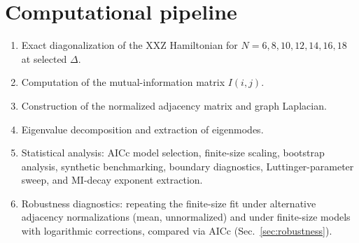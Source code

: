 \documentclass[aps,prd,twocolumn,superscriptaddress,nofootinbib]{revtex4-2}
\begin{document}
\appendix

\section{Computational pipeline}

\begin{enumerate}
\item Exact diagonalization of the XXZ Hamiltonian for
$N=6,8,10,12,14,16,18$ at selected $\Delta$.
\item Computation of the mutual-information matrix $I(i,j)$.
\item Construction of the normalized adjacency matrix and graph Laplacian.
\item Eigenvalue decomposition and extraction of eigenmodes.
\item Statistical analysis: AICc model selection, finite-size scaling,
bootstrap analysis, synthetic benchmarking, boundary diagnostics,
Luttinger-parameter sweep, and MI-decay exponent extraction.
\item Robustness diagnostics: repeating the finite-size fit under
alternative adjacency normalizations (mean, unnormalized) and under
finite-size models with logarithmic corrections, compared via AICc
(Sec.~\ref{sec:robustness}).
\end{enumerate}
\end{document}
